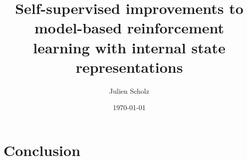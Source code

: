 \documentclass{article}
\title{Self-supervised improvements to model-based reinforcement learning with internal state representations}
\author{Julien Scholz}
\date{\today}
\begin{document}



\tableofcontents

\newpage


\newpage

\newpage

\newpage

\newpage
\section{Conclusion}

\newpage



\end{document}
